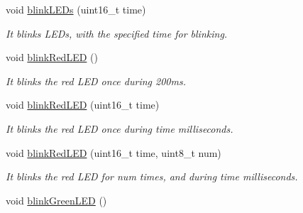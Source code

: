 \begin{DoxyCompactItemize}
void \hyperlink{class_wasp_utils_a8601be3064f49ac0b81819ed5ecbf2c8}{blink\+L\+E\+Ds} (uint16\+\_\+t time)
\begin{DoxyCompactList}\small\item\em It blinks L\+E\+Ds, with the specified time for blinking. \end{DoxyCompactList}\item 
void \hyperlink{class_wasp_utils_a347e5455e6bab377f34d6532a1899d52}{blink\+Red\+L\+ED} ()\hypertarget{class_wasp_utils_a347e5455e6bab377f34d6532a1899d52}{}\label{class_wasp_utils_a347e5455e6bab377f34d6532a1899d52}

\begin{DoxyCompactList}\small\item\em It blinks the red L\+ED once during 200ms. \end{DoxyCompactList}\item 
void \hyperlink{class_wasp_utils_a6e7c7d888d393fbc999716abce37aa56}{blink\+Red\+L\+ED} (uint16\+\_\+t time)
\begin{DoxyCompactList}\small\item\em It blinks the red L\+ED once during \textquotesingle{}time\textquotesingle{} milliseconds. \end{DoxyCompactList}\item 
void \hyperlink{class_wasp_utils_a5ac32b0ea82b0d687144ae00f52cb435}{blink\+Red\+L\+ED} (uint16\+\_\+t time, uint8\+\_\+t num)
\begin{DoxyCompactList}\small\item\em It blinks the red L\+ED for \textquotesingle{}num\textquotesingle{} times, and during \textquotesingle{}time\textquotesingle{} milliseconds. \end{DoxyCompactList}\item 
void \hyperlink{class_wasp_utils_a5bc157af15c9886a038f0fd0a41f87f3}{blink\+Green\+L\+ED} ()\hypertarget{class_wasp_utils_a5bc157af15c9886a038f0fd0a41f87f3}{}\label{class_wasp_utils_a5bc157af15c9886a038f0fd0a41f87f3}


\end{DoxyCompactItemize}
